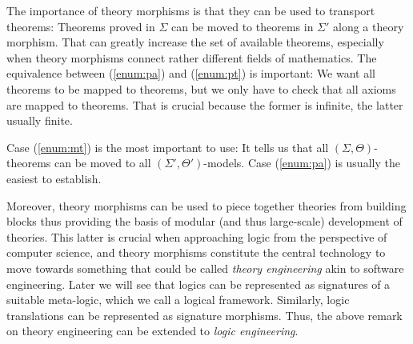 The importance of theory morphisms is that they can be used to transport theorems: Theorems proved in $\Sigma$ can be moved to theorems in $\Sigma'$ along a theory morphism. That can greatly increase the set of available theorems, especially when theory morphisms connect rather different fields of mathematics. The equivalence between (\ref{enum:pa}) and (\ref{enum:pt}) is important: We want all theorems to be mapped to theorems, but we only have to check that all axioms are mapped to theorems. That is crucial because the former is infinite, the latter usually finite.

Case (\ref{enum:mt}) is the most important to use: It tells us that all $(\Sigma,\Theta)$-theorems can be moved to all $(\Sigma',\Theta')$-models. Case (\ref{enum:pa}) is usually the easiest to establish.

Moreover, theory morphisms can be used to piece together theories from building blocks thus providing the basis of modular (and thus large-scale) development of theories. This latter is crucial when approaching logic from the perspective of computer science, and theory morphisms constitute the central technology to move towards something that could be called \emph{theory engineering} akin to software engineering.
Later we will see that logics can be represented as signatures of a suitable meta-logic, which we call a logical framework. Similarly, logic translations can be represented as signature morphisms. Thus, the above remark on theory engineering can be extended to \emph{logic engineering}.